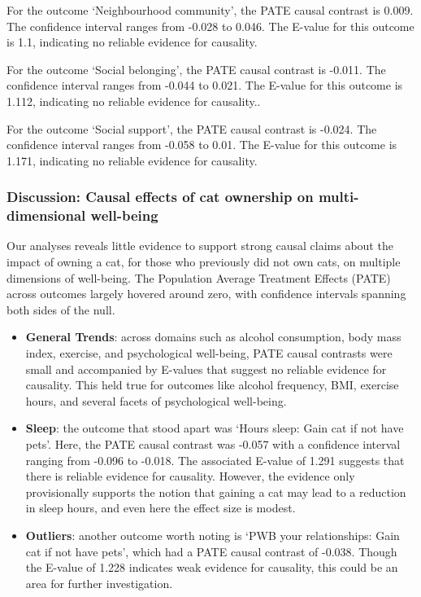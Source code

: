 \documentclass[
  singlecolumn,
  9pt]{article}
\begin{document}
For the outcome `Neighbourhood community', the PATE causal contrast is
0.009. The confidence interval ranges from -0.028 to 0.046. The E-value
for this outcome is 1.1, indicating no reliable evidence for causality.

For the outcome `Social belonging', the PATE causal contrast is -0.011.
The confidence interval ranges from -0.044 to 0.021. The E-value for
this outcome is 1.112, indicating no reliable evidence for causality..

For the outcome `Social support', the PATE causal contrast is -0.024.
The confidence interval ranges from -0.058 to 0.01. The E-value for this
outcome is 1.171, indicating no reliable evidence for causality.

\subsubsection{Discussion: Causal effects of cat ownership on
multi-dimensional
well-being}\label{discussion-causal-effects-of-cat-ownership-on-multi-dimensional-well-being}

Our analyses reveals little evidence to support strong causal claims
about the impact of owning a cat, for those who previously did not own
cats, on multiple dimensions of well-being. The Population Average
Treatment Effects (PATE) across outcomes largely hovered around zero,
with confidence intervals spanning both sides of the null.

\begin{itemize}
\item
  \textbf{General Trends}: across domains such as alcohol consumption,
  body mass index, exercise, and psychological well-being, PATE causal
  contrasts were small and accompanied by E-values that suggest no
  reliable evidence for causality. This held true for outcomes like
  alcohol frequency, BMI, exercise hours, and several facets of
  psychological well-being.
\item
  \textbf{Sleep}: the outcome that stood apart was `Hours sleep: Gain
  cat if not have pets'. Here, the PATE causal contrast was -0.057 with
  a confidence interval ranging from -0.096 to -0.018. The associated
  E-value of 1.291 suggests that there is reliable evidence for
  causality. However, the evidence only provisionally supports the
  notion that gaining a cat may lead to a reduction in sleep hours, and
  even here the effect size is modest.
\item
  \textbf{Outliers}: another outcome worth noting is `PWB your
  relationships: Gain cat if not have pets', which had a PATE causal
  contrast of -0.038. Though the E-value of 1.228 indicates weak
  evidence for causality, this could be an area for further
  investigation.
\end{itemize}
\end{document}
